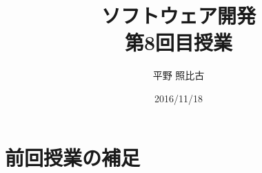 
\title{ソフトウェア開発\\第8回目授業}
\author{平野 照比古}
\institute{}
\date{2016/11/18}
\newtheorem{Prob}{解説}
\newcommand{\Elm}[1]{\texttt{<#1>}}

\newcommand{\DOMM}{\texttt}
\newcommand{\Event}{\texttt}
\newcommand{\DOMP}{\texttt}
\newcommand{\DOM}{\texttt{DOM}}
\newcommand{\keyitem}{\relax}
\newcommand{\HTML}{HTML文書}

\frame{\maketitle}
\iffalse
\section{前回授業の補足}
